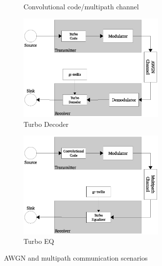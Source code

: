 \documentclass[11pt,		%
	    DIV12,		%
	    a4paper,		%
	    final,		%
	    halfparskip,	%
	    ]{scrartcl}		%
\begin{document}
\begin{figure}[htbp]
\begin{subfigure}[bt] {0.45\textwidth}
  \caption{Convolutional code/multipath channel}
    \label{fig:eq}
  \end{subfigure}
  \begin{subfigure}[bt]{0.45\textwidth}
       \includegraphics[width=0.8\textwidth]{figures/turbodec.eps}
  \caption{Turbo Decoder}
    \label{fig:turbodec}
  \end{subfigure}
  \begin{subfigure}[bt] {0.45\textwidth}
     \includegraphics[width=0.8\textwidth]{figures/turboeq.eps}
  \caption{Turbo EQ}
    \label{fig:turboeq}
  \end{subfigure}  
  \caption{AWGN and multipath communication scenarios}
    
\end{figure}
\end{document}
